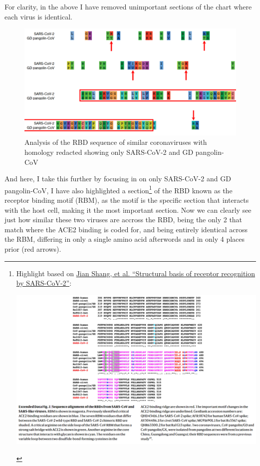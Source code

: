 \documentclass[11pt]{article}
\begin{document}
For clarity, in the above I have removed unimportant sections of the chart where each virus is identical.

\begin{figure}[htbp]
\centering
\includegraphics[width=.9\linewidth]{./images/rbd-comp-2.png}
\caption{Analysis of the RBD sequence of similar coronaviruses with homology redacted showing only SARS-CoV-2 and GD pangolin-CoV}
\end{figure}

And here, I take this further by focusing in on only SARS-CoV-2 and GD pangolin-CoV, I have also highlighted a section\footnote{Highlight based on \href{https://www.nature.com/articles/s41586-020-2179-y.pdf}{Jian Shang, et al. ``Structural basis of receptor recognition by SARS-CoV-2''}:
\begin{center}
\includegraphics[width=.9\linewidth]{./images/sars2-rbm.png}
\end{center}} of the RBD known as the receptor binding motif (RBM), as the motif is the specific section that interacts with the host cell, making it the most important section. Now we can clearly see just how similar these two viruses are accross the RBD, being the only 2 that match where the ACE2 binding is coded for, and being entirely identical across the RBM, differing in only a single amino acid afterwords and in only 4 places prior (red arrows).
\end{document}
